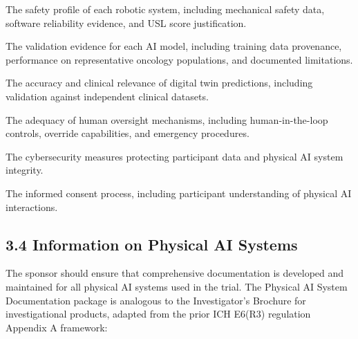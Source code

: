 \begin{description}[leftmargin=2.5cm,style=sameline]

\item[(a)] The safety profile of each robotic system, including mechanical safety data, software reliability evidence, and USL score justification.

\item[(b)] The validation evidence for each AI model, including training data provenance, performance on representative oncology populations, and documented limitations.

\item[(c)] The accuracy and clinical relevance of digital twin predictions, including validation against independent clinical datasets.

\item[(d)] The adequacy of human oversight mechanisms, including human-in-the-loop controls, override capabilities, and emergency procedures.

\item[(e)] The cybersecurity measures protecting participant data and physical AI system integrity.

\item[(f)] The informed consent process, including participant understanding of physical AI interactions.

\end{description}

\subsection{3.4 Information on Physical AI Systems}

The sponsor should ensure that comprehensive documentation is developed and maintained for all physical AI systems used in the trial. The Physical AI System Documentation package is analogous to the Investigator's Brochure for investigational products, adapted from the prior ICH E6(R3) regulation Appendix A framework:

